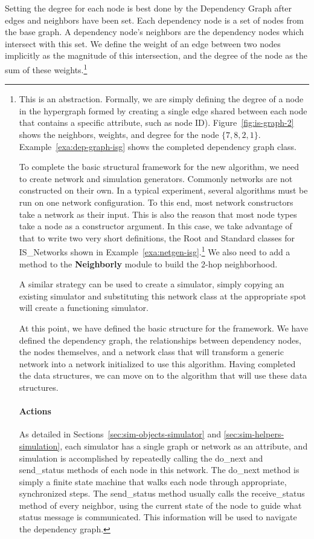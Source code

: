 Setting the degree for each node is best done by the Dependency Graph after edges and neighbors have been set. Each dependency node is a set of nodes from the base graph. A dependency node's neighbors are the dependency nodes which intersect with this set. We define the weight of an edge between two nodes implicitly as the magnitude of this intersection, and the degree of the node as the sum of these weights.\footnote{This is an abstraction. Formally, we are simply defining the degree of a node in the hypergraph formed by creating a single edge shared between each node that contains a specific attribute, such as node ID).  Figure~\ref{fig:is-graph-2} shows the neighbors, weights, and degree for the node $\{7,8,2,1\}$. Example~\ref{exa:dep-graph-isg} shows the completed dependency graph class.
 

To complete the basic structural framework for the new algorithm, we need to create network and simulation generators. Commonly networks are not constructed on their own. In a typical experiment, several algorithms must be run on one network configuration. To this end, most network constructors take a network as their input. This is also the reason that most node types take a node as a constructor argument. In this case, we take advantage of that to write two very short definitions, the Root and Standard classes for IS\_Networks shown in Example~\ref{exa:netgen-isg}.\footnote{It is also important to require the file containing the IS Node definitions in the 'netgen.rb' file.} We also need to add a method to the {\bf Neighborly} module to build the 2-hop neighborhood.

 A similar strategy can be used to create a simulator, simply copying an existing simulator and substituting this network class at the appropriate spot will create a functioning simulator.

At this point, we have defined the basic structure for the framework. We have defined the dependency graph, the relationships between dependency nodes, the nodes themselves, and a network class that will transform a generic network into a network initialized to use this algorithm. Having completed the data structures, we can move on to the algorithm that will use these data structures. 



\paragraph{Actions}
As detailed in Sections~\ref{sec:sim-objects-simulator} and \ref{sec:sim-helpers-simulation}, each simulator has a single graph or network as an attribute, and simulation is accomplished by repeatedly calling the {\ttfamily do\_next} and {\ttfamily send\_status} methods of each node in this network. The {\ttfamily do\_next} method is simply a finite state machine that walks each node through appropriate, synchronized steps. The {send\_status} method usually calls the {\ttfamily receive\_status} method of every neighbor, using the current state of the node to guide what status message is communicated. This information will be used to navigate the dependency graph. 

}
